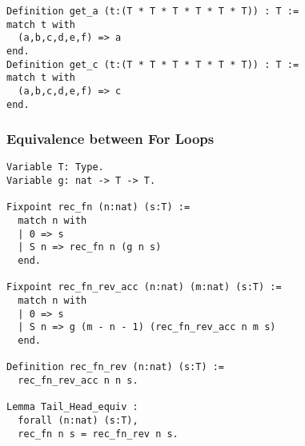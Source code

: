 \begin{lstlisting}[language=Coq]
Definition get_a (t:(T * T * T * T * T * T)) : T :=
match t with
  (a,b,c,d,e,f) => a
end.
Definition get_c (t:(T * T * T * T * T * T)) : T :=
match t with
  (a,b,c,d,e,f) => c
end.
\end{lstlisting}

\subsubsection{Equivalence between For Loops}
\label{subsubsec:for}

\begin{lstlisting}[language=Coq]
Variable T: Type.
Variable g: nat -> T -> T.

Fixpoint rec_fn (n:nat) (s:T) :=
  match n with
  | 0 => s
  | S n => rec_fn n (g n s)
  end.

Fixpoint rec_fn_rev_acc (n:nat) (m:nat) (s:T) :=
  match n with
  | 0 => s
  | S n => g (m - n - 1) (rec_fn_rev_acc n m s)
  end.

Definition rec_fn_rev (n:nat) (s:T) :=
  rec_fn_rev_acc n n s.

Lemma Tail_Head_equiv :
  forall (n:nat) (s:T),
  rec_fn n s = rec_fn_rev n s.
\end{lstlisting}
